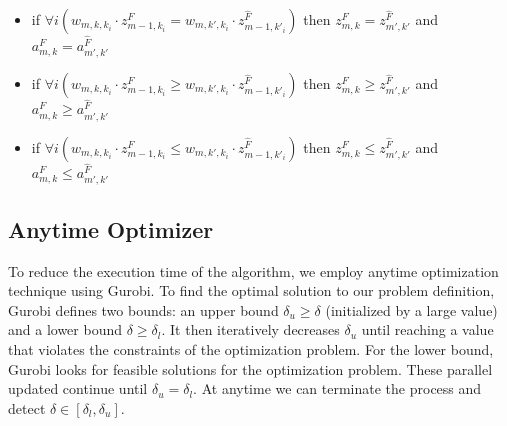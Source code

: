 \begin{itemize}
    \item if $\forall{i} (w_{m,k,k_i}\cdot{z^F_{m-1,k_i}}=w_{m,k',k_i}\cdot{z^{\hat{F}}_{m-1,k'_i}})$ then $z^F_{m,k}=z^{\hat{F}}_{m',k'}$ and $a^F_{m,k}=a^{\hat{F}}_{m',k'}$
    \item if $\forall{i} (w_{m,k,k_i}\cdot{z^F_{m-1,k_i}}\ge{w_{m,k',k_i}\cdot{z^{\hat{F}}_{m-1,k'_i}}})$ then $z^F_{m,k}\ge{z^{\hat{F}}_{m',k'}}$ and $a^F_{m,k}\ge{a^{\hat{F}}_{m',k'}}$
    \item if $\forall{i} (w_{m,k,k_i}\cdot{z^F_{m-1,k_i}}\le{w_{m,k',k_i}\cdot{z^{\hat{F}}_{m-1,k'_i}}})$ then $z^F_{m,k}\le{z^{\hat{F}}_{m',k'}}$ and $a^F_{m,k}\le{a^{\hat{F}}_{m',k'}}$
\end{itemize}

\subsection{Anytime Optimizer}
To reduce the execution time of the algorithm, we employ anytime optimization technique using Gurobi. To find the optimal solution to our problem definition, Gurobi defines two bounds: an upper bound $\delta_u\geq\delta$ (initialized by a large value) and a lower bound $\delta\geq\delta_l$. It then iteratively decreases $\delta_u$ until reaching a value that violates the constraints of the optimization problem. For the lower bound, Gurobi looks for feasible solutions for the optimization problem. These parallel updated continue until $\delta_u=\delta_l$. At anytime we can terminate the process and detect $\delta\in[\delta_l,\delta_u]$. 